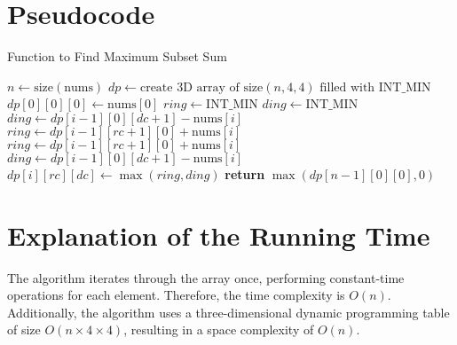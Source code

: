 \documentclass{article}
\begin{document}
\section{Pseudocode}
    \begin{algorithm}
    \caption{Function to Find Maximum Subset Sum}
        \begin{algorithmic}[1]

                \State $n \gets \text{size}(\text{nums})$
                \State $dp \gets \text{create 3D array of size} (n, 4, 4) \text{ filled with } \text{INT\_MIN}$
                \State $dp[0][0][0] \gets \text{nums}[0]$  
                            \State $ring \gets \text{INT\_MIN}$
                            \State $ding \gets \text{INT\_MIN}$
                                \State $ding \gets dp[i-1][0][dc+1] - \text{nums}[i]$
                                \State $ring \gets dp[i-1][rc+1][0] + \text{nums}[i]$
                            \Else
                                \State $ring \gets dp[i-1][rc+1][0] + \text{nums}[i]$
                                \State $ding \gets dp[i-1][0][dc+1] - \text{nums}[i]$
                            \EndIf
                            \State $dp[i][rc][dc] \gets \max(ring, ding)$
                        \EndFor
                    \EndFor
                \EndFor
                \State \textbf{return} $\max(dp[n-1][0][0], 0)$

                \EndFunction
        \end{algorithmic}
    \end{algorithm}

\section{Explanation of the Running Time}
    The algorithm iterates through the array once, performing constant-time operations for each element. Therefore, the time complexity is $O(n)$. Additionally, the algorithm uses a three-dimensional dynamic programming table of size $O(n \times 4 \times 4)$, resulting in a space complexity of $O(n)$.
\end{document}
